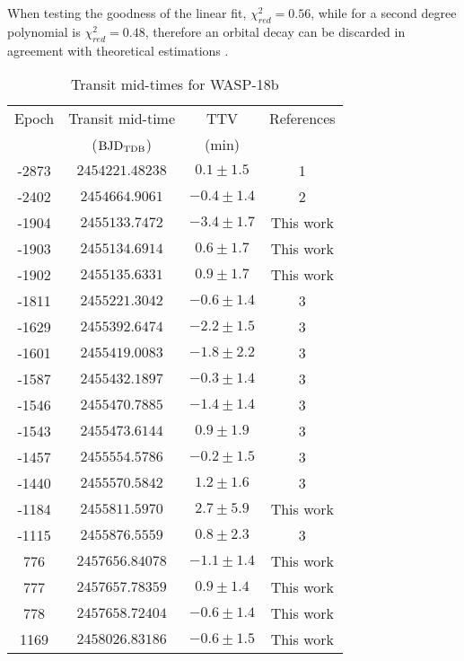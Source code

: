 When testing the goodness of the linear fit, $\chi^{2}_{red} =0.56$, while for a second degree polynomial is $\chi^{2}_{red}=0.48$, therefore an orbital decay can be discarded in agreement with theoretical estimations \citep{CollierCameron2018}.  


\begin{table}
\caption{Transit mid-times for WASP-18b}
\label{times_wasp18}
\begin{tabular}{cccc}
\hline \hline
Epoch & Transit mid-time & TTV & References\\
      & (${\rm BJD_{TDB}}$) & (min) & \\
\hline 
-2873 & $2454221.48238$ & $0.1\pm1.5$ & 1\\
-2402 & $2454664.9061$ & $-0.4\pm1.4$ & 2 \\
-1904 & $2455133.7472$ & $-3.4\pm1.7$ & This work \\
-1903 & $2455134.6914$ & $0.6\pm1.7$ & This work \\
-1902 & $2455135.6331$  & $0.9\pm1.7$  & This work \\
-1811 & $2455221.3042$ & $-0.6\pm1.4$  & 3\\
-1629 & $2455392.6474$ & $-2.2\pm1.5$& 3 \\
-1601 & $2455419.0083$ & $-1.8\pm2.2$& 3\\
-1587 & $2455432.1897$ & $-0.3\pm1.4$ & 3\\
-1546 & $2455470.7885$ & $-1.4\pm1.4$ & 3\\
-1543 & $2455473.6144$ & $0.9\pm1.9$& 3\\
-1457 & $2455554.5786$ & $-0.2\pm1.5$&3 \\
-1440 & $2455570.5842$ & $1.2\pm1.6$& 3\\
-1184 & $2455811.5970$ &  $2.7\pm5.9$ & This work  \\
-1115 & $2455876.5559$ & $0.8\pm2.3$ & 3 \\ 
776 & $2457656.84078$ & $-1.1\pm1.4$ & This work  \\
777 & $2457657.78359$   & $0.9\pm1.4$ & This work\\
778 & $2457658.72404$ & $-0.6\pm1.4$ & This work \\
1169 & $2458026.83186$ & $-0.6\pm1.5$ & This work  \\
\hline
\end{tabular}
\end{table}     